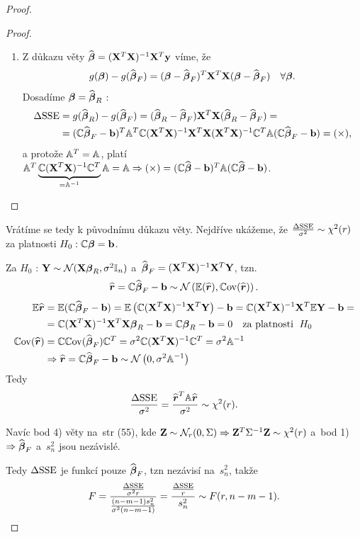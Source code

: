 \begin{proof}
\begin{proof}
\begin{enumerate}
\item
Z důkazu věty $\wbetab = \xtx \X^T \y$ víme, že
 $$
g(\betab) - g(\wbetab_F) = (\betab - \wbetab_F)^T \X^T \X (\betab - \wbetab_F) \quad \forall \betab.
 $$
Dosadíme $\betab = \wbetab_R$ :
\begin{align*}
	\Delta \SSE & = g(\wbetab_R) - g(\wbetab_F) = (\wbetab_R - \wbetab_F) \X^T \X (\wbetab_R - \wbetab_F) = \\
	& = (\C \wbetab_F - \bb)^T \Am^T \C \xtx \X^T \X \xtx \C^T \Am (\C \wbetab_F - \bb) = (\times),
\end{align*}
a protože $\Am^T = \Am$, platí $\Am^T\underbrace{\C \xtx \C^T}_{ = \Am^{-1}} \Am = \Am \Rightarrow (\times) = (\C \wbetab - \bb)^T \Am (\C \wbetab - \bb)$.

\end{enumerate}
\end{proof}


Vrátíme se tedy k původnímu důkazu věty. Nejdříve ukážeme, že $\frac{\Delta \SSE}{\sigma^2} \sim \chi^2 (r)$ za platnosti $H_0: \C\betab = \bb$.

Za $H_0$ : $\Y \sim \NN(\X \betab_R, \sigma^2 \Identita{n})$ a~$\wbetab_F = \xtx \X^T \Y$, tzn.
 $$
\widehat{\boldsymbol{r}} = \C \wbetab_F - \bb \sim \NN\left(\E(\widehat{\boldsymbol{r}}), \Cov(\widehat{\boldsymbol{r}}) \right).
 $$
\begin{align*}
\E \widehat{\boldsymbol{r}} & = \E (\C \wbetab_F - \bb) = \E \left(\C \xtx \X^T \Y \right) - \bb = \C \xtx \X^T \E \Y - \bb = \\
& = \C \xtx \X^T \X \betab_R - \bb = \C \betab_R - \bb = 0 \quad \text{za platnosti \;} H_0 \\
\Cov(\widehat{\boldsymbol{r}}) & = \C \Cov(\wbetab_F) \C^T = \sigma^2 \C \xtx \C^T = \sigma^2 \Am^{-1} \\
& \Rightarrow \widehat{\boldsymbol{r}} = \C \wbetab_F - \bb \sim \NN \left(0, \sigma^2 \Am^{-1} \right)
\end{align*}
Tedy
 $$
\frac{\Delta \SSE}{\sigma^2} = \frac{\widehat{\boldsymbol{r}}^T \Am \widehat{\boldsymbol{r}}}{\sigma^2} \sim \chi^2(r).
 $$

Navíc bod 4) věty na~str (55), kde $\Zb \sim \NN_r(0, \Sigma) \Rightarrow \Zb^T \Sigma^{-1} \Zb \sim \chi^2(r)$ a~bod 1) $\Rightarrow \wbetab_F$ a~$s_n^2$ jsou nezávislé.

Tedy $\Delta \SSE$ je funkcí pouze $\wbetab_F$, tzn nezávisí na~$s_n^2$, takže
 $$
F = \frac{\frac{\Delta \SSE}{\sigma^2 r}}{\frac{(n-m-1)s_n^2}{\sigma^2(n-m-1)}} = \frac{\frac{\Delta \SSE}{r}}{s_n^2} \sim F(r, n-m-1).
 $$
\end{proof}

